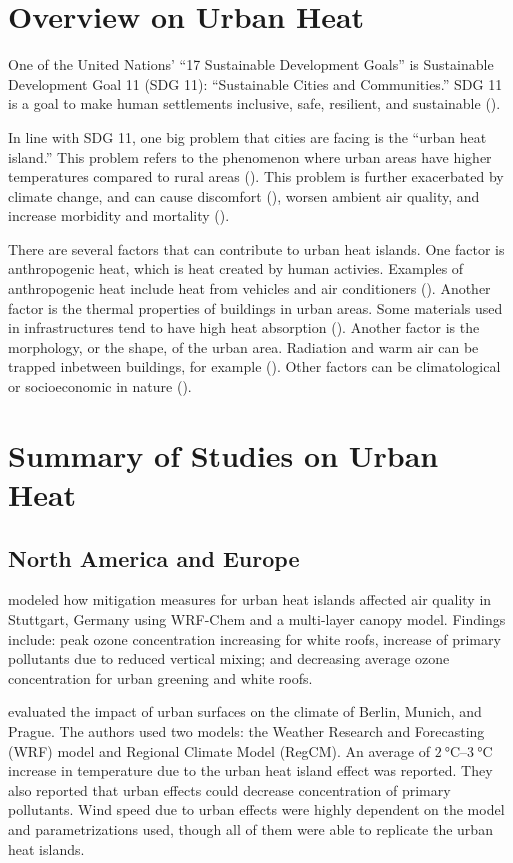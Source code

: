 \section{Overview on Urban Heat}
	One of the United Nations’ ``17 Sustainable Development Goals'' is Sustainable Development Goal 11 (SDG 11): ``Sustainable Cities and Communities.'' 
	SDG 11 is a goal to make human settlements inclusive, safe, resilient, and sustainable (\cite{UN2015}).
	
	In line with SDG 11, one big problem that cities are facing is the ``urban heat island.'' 
	This problem refers to the phenomenon where urban areas have higher temperatures compared to rural areas (\cite{Khan2021}).
	This problem is further exacerbated by climate change, and can cause discomfort (\cite{Bhati2018}), worsen ambient air quality, and increase morbidity and mortality (\cite {Khan2021}).
	
	There are several factors that can contribute to urban heat islands.
	One factor is anthropogenic heat, which is heat created by human activies.
	Examples of anthropogenic heat include heat from vehicles and air conditioners (\cite{Kim2021}).
	Another factor is the thermal properties of buildings in urban areas. 
	Some materials used in infrastructures tend to have high heat absorption (\cite{Kim2021}). 
	Another factor is the morphology, or the shape, of the urban area.
	Radiation and warm air can be trapped inbetween buildings, for example (\cite{Wang2023}). 
	Other factors can be climatological or socioeconomic in nature (\cite{Khan2021}).

\section{Summary of Studies on Urban Heat}	
	\subsection{North America and Europe}
		\textcite{Fallmann2016} modeled how mitigation measures for urban heat islands affected air quality in Stuttgart, Germany using WRF-Chem and a multi-layer canopy model. Findings include: 
			peak ozone concentration increasing for white roofs, 
			increase of primary pollutants due to reduced vertical mixing; and 
			decreasing average ozone concentration for urban greening and white roofs.
		
		\textcite{Karlicky2018} evaluated the impact of urban surfaces on the climate of Berlin, Munich, and Prague.
		The authors used two models: the Weather Research and Forecasting (WRF) model and Regional Climate Model (RegCM).
		An average of $\qtyrange{2}{3}{\degreeCelsius}$ increase in temperature due to the urban heat island effect was reported.
		They also reported that urban effects could decrease concentration of primary pollutants.
		Wind speed due to urban effects were highly dependent on the model and parametrizations used, though all of them were able to replicate the urban heat islands.
		
